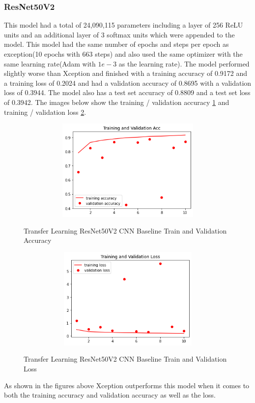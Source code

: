 \subsubsection{ResNet50V2}
This model had a total of 24,090,115 parameters including a layer of 256 ReLU units and an additional layer of 3 softmax units which were appended to the model.  This model had the same number of epochs and steps per epoch as exception(10 epochs with 663 steps) and also used the same optimizer with the same learning rate(Adam with $1e-3$ as the learning rate).  The model performed slightly worse than Xception and finished with a training accuracy of 0.9172 and a training loss of 0.2024 and had a validation accuracy of 0.8695 with a validation loss of 0.3944.  The model also has a test set accuracy of 0.8809 and a test set loss of 0.3942.  The images below show the training / validation accuracy \ref{fig:Transfer Learning ResNet50V2 CNN Baseline Train and Validation Accuracy Radiography} and training / validation loss \ref{fig:Transfer Learning ResNet50V2 CNN Baseline Train and Validation Loss Radiography}. 
 \begin{figure}[H]
    \centering
    \includegraphics[width=1\textwidth,height=5cm,keepaspectratio]{Images/ResNet50V2BaselineTrainingValidationAccRadiography.png}\\
    \caption{Transfer Learning ResNet50V2 CNN Baseline Train and Validation Accuracy}
    \label{fig:Transfer Learning ResNet50V2 CNN Baseline Train and Validation Accuracy Radiography}
\end{figure}
 \begin{figure}[H]
    \centering
    \includegraphics[width=1\textwidth,height=5cm,keepaspectratio]{Images/ResNet50V2BaselineTrainingValidationLossRadiography.png}\\
    \caption{Transfer Learning ResNet50V2 CNN Baseline Train and Validation Loss}
    \label{fig:Transfer Learning ResNet50V2 CNN Baseline Train and Validation Loss Radiography}
\end{figure}
As shown in the figures above Xception outperforms this model when it comes to both the training accuracy and validation accuracy as well as the loss.
